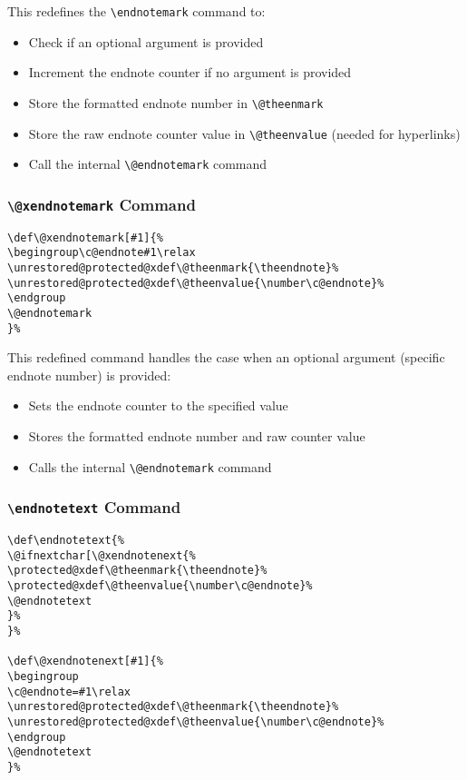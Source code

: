 \documentclass[11pt]{article}
\newcommand{\cmd}[1]{\texttt{\textbackslash#1}}
\begin{document}
This redefines the \cmd{endnotemark} command to:
\begin{itemize}
  \item Check if an optional argument is provided
  \item Increment the endnote counter if no argument is provided
  \item Store the formatted endnote number in \cmd{@theenmark}
  \item Store the raw endnote counter value in \cmd{@theenvalue} (needed for hyperlinks)
  \item Call the internal \cmd{@endnotemark} command
\end{itemize}

\subsubsection{\cmd{@xendnotemark} Command}

\begin{tcolorbox}[colback=gray!5, colframe=gray!75, title=@xendnotemark Redefinition]
\begin{lstlisting}
\def\@xendnotemark[#1]{%
\begingroup\c@endnote#1\relax
\unrestored@protected@xdef\@theenmark{\theendnote}%
\unrestored@protected@xdef\@theenvalue{\number\c@endnote}%
\endgroup
\@endnotemark
}%
\end{lstlisting}
\end{tcolorbox}

This redefined command handles the case when an optional argument (specific endnote number) is provided:
\begin{itemize}
  \item Sets the endnote counter to the specified value
  \item Stores the formatted endnote number and raw counter value
  \item Calls the internal \cmd{@endnotemark} command
\end{itemize}

\subsubsection{\cmd{endnotetext} Command}

\begin{tcolorbox}[colback=gray!5, colframe=gray!75, title=endnotetext Redefinition]
\begin{lstlisting}
\def\endnotetext{%
\@ifnextchar[\@xendnotenext{%
\protected@xdef\@theenmark{\theendnote}%
\protected@xdef\@theenvalue{\number\c@endnote}%
\@endnotetext
}%
}%

\def\@xendnotenext[#1]{%
\begingroup
\c@endnote=#1\relax
\unrestored@protected@xdef\@theenmark{\theendnote}%
\unrestored@protected@xdef\@theenvalue{\number\c@endnote}%
\endgroup
\@endnotetext
}%
\end{lstlisting}
\end{tcolorbox}
\end{document}
